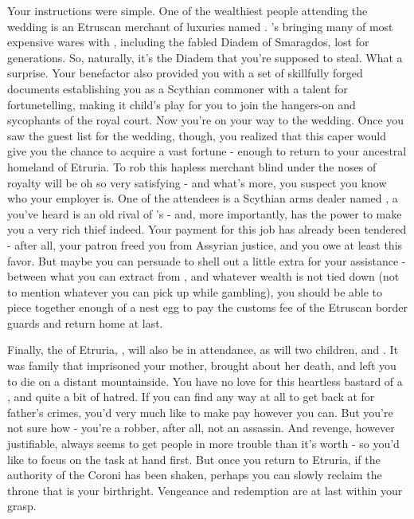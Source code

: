 \documentclass[char]{Kos}
\begin{document}
    Your instructions were simple. One of the wealthiest people attending the wedding is an Etruscan merchant of luxuries named \cMerchant{}. \cMerchant{\They}'s bringing many of \cMerchant{\their} most expensive wares with \cMerchant{\them}, including the fabled Diadem of Smaragdos, lost for generations. So, naturally, it's the Diadem that you're supposed to steal. What a surprise. Your benefactor also provided you with a set of skillfully forged documents establishing you as a Scythian commoner with a talent for fortunetelling, making it child's play for you to join the hangers-on and sycophants of the royal court. Now you're on your way to the wedding. Once you saw the guest list for the wedding, though, you realized that this caper would give you the chance to acquire a vast fortune - enough to return to your ancestral homeland of Etruria. To rob this hapless merchant blind under the noses of royalty will be oh so very satisfying - and what's more, you suspect you know who your employer is. One of the attendees is a Scythian arms dealer named \cArmsDealer{}, a \cArmsDealer{\human} you've heard is an old rival of \cMerchant{}'s - and, more importantly, \cArmsDealer{\they} has the power to make you a very rich thief indeed. Your payment for this job has already been tendered - after all, your patron freed you from Assyrian justice, and you owe \cArmsDealer{\them} at least this favor. But maybe you can persuade \cArmsDealer{\them} to shell out a little extra for your assistance - between what you can extract from \cArmsDealer{\them}, and whatever wealth is not tied down (not to mention whatever you can pick up while gambling), you should be able to piece together enough of a nest egg to pay the customs fee of the Etruscan border guards and return home at last. 

    Finally, the \cEtruriaKing{\monarch} of Etruria, \cEtruriaKing{}, will also be in attendance, as will \cEtruriaKing{\their} two children, \cGroom{} and \cPoet{}. It was \cEtruriaKing{\their} family that imprisoned your mother, brought about her death, and left you to die on a distant mountainside. You have no love for this heartless bastard of a \cEtruriaKing{\human}, and quite a bit of hatred. If you can find any way at all to get back at \cEtruriaKing{} for \cEtruriaKing{\their} father's crimes, you'd very much like to make \cEtruriaKing{\them} pay however you can. But you're not sure how - you're a robber, after all, not an assassin. And revenge, however justifiable, always seems to get people in more trouble than it's worth - so you'd like to focus on the task at hand first. But once you return to Etruria, if the authority of the Coroni has been shaken, perhaps you can slowly reclaim the throne that is your birthright. Vengeance and redemption are at last within your grasp. 
\end{document}
